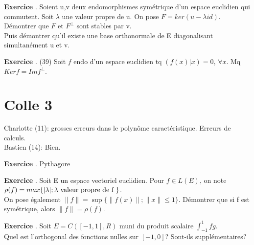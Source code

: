 \documentclass[10pt,a4paper]{article}
\newcounter{question}
\newcounter{exo}
\newenvironment{exo}{\vspace{0.5cm}\setcounter{question}{0}\addtocounter{exo}{1} \noindent \textbf{Exercice \theexo}. \normalsize }{\par}
\begin{document}
	\begin{exo}
		Soient u,v deux endomorphismes symétrique d'un espace euclidien qui commutent.
 Soit $\lambda$ une valeur propre de u. On pose $F=ker(u−\lambda id)$. Démontrer que $F$ et $F^\bot$ sont stables par v.\\
 Puis démontrer qu'il existe une base orthonormale de E diagonalisant simultanément u et v.
	\end{exo}

	\begin{exo}
		(39) Soit $f$ endo d'un espace euclidien tq $(f(x) \vert x) = 0$, $\forall x$. Mq $Ker f = Im f ^\perp$.
	\end{exo}
	
	\section*{Colle 3}
	\setcounter{exo}{0}
	Charlotte (11): grosses erreurs dans le polynôme caractéristique. Erreurs de calculs. \\
	Bastien (14): Bien.

	\begin{exo}
		Pythagore
	\end{exo}

	\begin{exo}
		Soit E un espace vectoriel euclidien. Pour $f \in L(E)$, on note $\rho(f) = max \lbrace \vert \lambda \vert; \lambda \textnormal{ valeur propre de f }\rbrace$. \\
		On pose également $\parallel f \parallel=\sup \lbrace \parallel f(x) \parallel; \parallel x \parallel \leq 1 \rbrace$. Démontrer que si f est symétrique, alors $\parallel f \parallel=\rho(f)$.
	\end{exo}

	\begin{exo}
		Soit $E = C ([−1, 1] , R)$ muni du produit scalaire $\int_{-1}^{1} fg$.\\
		Quel est l'orthogonal des fonctions nulles sur $[-1, 0]$? Sont-ils supplémentaires?
	\end{exo}

%	
%	
%	
\end{document}
